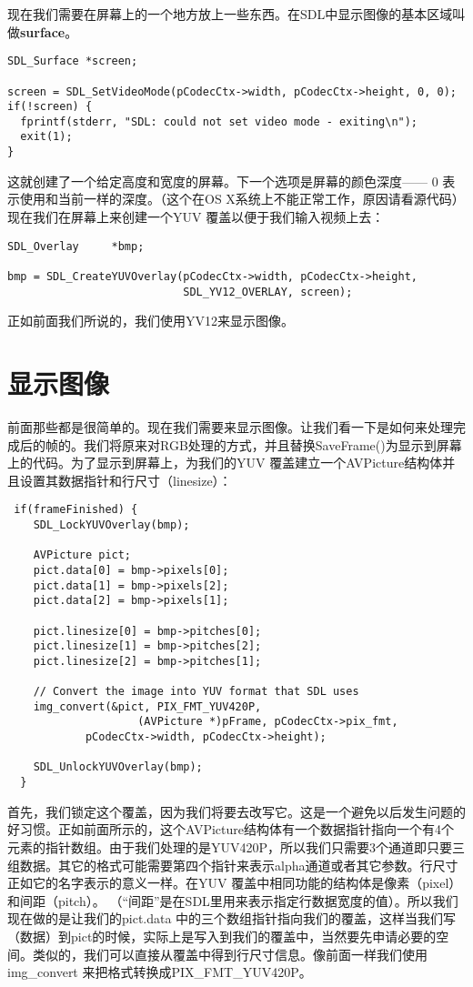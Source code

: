 现在我们需要在屏幕上的一个地方放上一些东西。在SDL中显示图像的基本区域叫做\textbf{surface}。

\begin{lstlisting}
SDL_Surface *screen;

screen = SDL_SetVideoMode(pCodecCtx->width, pCodecCtx->height, 0, 0);
if(!screen) {
  fprintf(stderr, "SDL: could not set video mode - exiting\n");
  exit(1);
}
\end{lstlisting}

这就创建了一个给定高度和宽度的屏幕。下一个选项是屏幕的颜色深度—— 0 表示使用和当前一样的深度。（这个在OS X系统上不能正常工作，原因请看源代码）现在我们在屏幕上来创建一个YUV 覆盖以便于我们输入视频上去：

\begin{lstlisting}
SDL_Overlay     *bmp;

bmp = SDL_CreateYUVOverlay(pCodecCtx->width, pCodecCtx->height,
                           SDL_YV12_OVERLAY, screen);
\end{lstlisting}

正如前面我们所说的，我们使用YV12来显示图像。

\section{显示图像}

前面那些都是很简单的。现在我们需要来显示图像。让我们看一下是如何来处理完成后的帧的。我们将原来对RGB处理的方式，并且替换SaveFrame()为显示到屏幕上的代码。为了显示到屏幕上，为我们的YUV 覆盖建立一个AVPicture结构体并且设置其数据指针和行尺寸（linesize）：

\begin{lstlisting}
 if(frameFinished) {
    SDL_LockYUVOverlay(bmp);

    AVPicture pict;
    pict.data[0] = bmp->pixels[0];
    pict.data[1] = bmp->pixels[2];
    pict.data[2] = bmp->pixels[1];

    pict.linesize[0] = bmp->pitches[0];
    pict.linesize[1] = bmp->pitches[2];
    pict.linesize[2] = bmp->pitches[1];

    // Convert the image into YUV format that SDL uses
    img_convert(&pict, PIX_FMT_YUV420P,
                    (AVPicture *)pFrame, pCodecCtx->pix_fmt,
            pCodecCtx->width, pCodecCtx->height);

    SDL_UnlockYUVOverlay(bmp);
  }
\end{lstlisting}

首先，我们锁定这个覆盖，因为我们将要去改写它。这是一个避免以后发生问题的好习惯。正如前面所示的，这个AVPicture结构体有一个数据指针指向一个有4个元素的指针数组。由于我们处理的是YUV420P，所以我们只需要3个通道即只要三组数据。其它的格式可能需要第四个指针来表示alpha通道或者其它参数。行尺寸正如它的名字表示的意义一样。在YUV 覆盖中相同功能的结构体是像素（pixel）和间距（pitch）。 （“间距”是在SDL里用来表示指定行数据宽度的值）。所以我们现在做的是让我们的pict.data 中的三个数组指针指向我们的覆盖，这样当我们写（数据）到pict的时候，实际上是写入到我们的覆盖中，当然要先申请必要的空间。类似的，我们可以直接从覆盖中得到行尺寸信息。像前面一样我们使用img_convert 来把格式转换成PIX_FMT_YUV420P。

